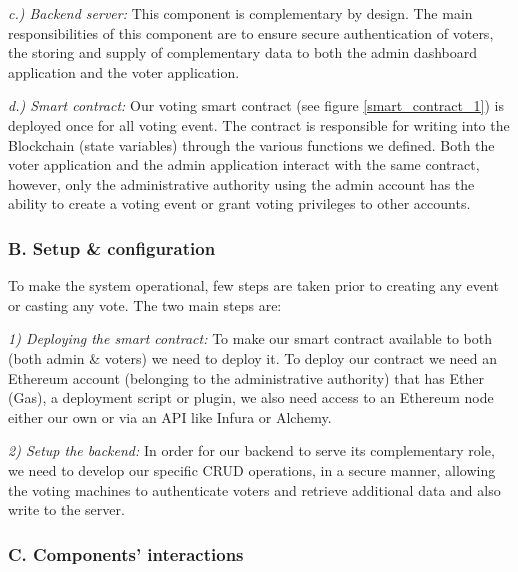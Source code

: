 \textit{c.) Backend server:} This component is complementary by design. The main responsibilities of this component are to ensure secure authentication of voters, the storing and supply of complementary data to both the admin dashboard application and the voter application.

\textit{d.) Smart contract:} Our voting smart contract (see figure \ref{smart_contract_1}) is deployed once for all voting event. The contract is responsible for writing into the Blockchain (state variables) through the various functions we defined. Both the voter application and the admin application interact with the same contract, however, only the administrative authority using the admin account has the ability to create a voting event or grant voting privileges to other accounts.


\subsubsection{B. Setup \& configuration}

To make the system operational, few steps are taken prior to creating any event or casting any vote. The two main steps are:

\textit{1) Deploying the smart contract:} To make our smart contract available to both (both admin \& voters) we need to deploy it. To deploy our contract we need an Ethereum account (belonging to the administrative authority) that has Ether (Gas), a deployment script or plugin, we also need access to an Ethereum node either our own or via an API like Infura\cite{EthereumAPIIPFS} or Alchemy\cite{AlchemyBlockchainDeveloper}.

\textit{2) Setup the backend:} In order for our backend to serve its complementary role, we need to develop our specific \acrshort{CRUD} operations, in a secure manner, allowing the voting machines to authenticate voters and retrieve additional data and also write to the server.

\subsubsection{C. Components' interactions}

